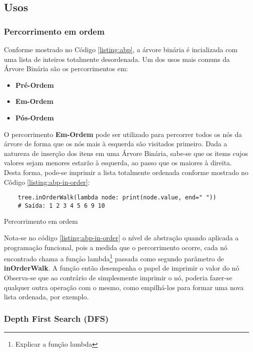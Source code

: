 \subsection{Usos}
\subsubsection{Percorrimento em ordem}
Conforme mostrado no Código \ref{listing:abp}, a árvore binária é incializada com uma lista de inteiros totalmente desordenada.
Um dos usos mais comuns da Árvore Binária são os percorrimentos em:
\begin{itemize}
    \item\textbf{Pré-Ordem}
    \item\textbf{Em-Ordem}
    \item\textbf{Pós-Ordem}
\end{itemize}

O percorrimento \textbf{Em-Ordem} pode ser utilizado para percorrer todos os nós da árvore de forma que os nós mais à esquerda são visitados primeiro. Dada a natureza de inserção dos itens em uma Árvore Binária,
sabe-se que os items cujos valores sejam menores estarão à esquerda, ao passo que os maiores à direita. Desta forma, pode-se imprimir a lista totalmente ordenada conforme mostrado no Côdigo \ref{listing:abp-in-order}:

\begin{listing}[H]
    \begin{verbatim}
    tree.inOrderWalk(lambda node: print(node.value, end=" "))
    # Saída: 1 2 3 4 5 6 9 10 
    \end{verbatim}
    \caption{Percorrimento em ordem}
    \label{listing:abp-in-order}
\end{listing}

Nota-se no código \ref{listing:abp-in-order} o nível de abstração quando aplicada a programação funcional, pois a medida que o percorrimento ocorre, cada nó encontrado chama a funçåo lambda\footnote{
    Explicar a função lambda
} passada como segundo parâmetro de \textbf{inOrderWalk}. A função então desempenha o papel de imprimir o valor do nó
Observa-se que ao contrário de simplesmente imprimir o nó, poderia fazer-se qualquer outra operação com o mesmo, como empilhá-los para formar uma nova lista
ordenada, por exemplo.

\subsubsection{Depth First Search (DFS)}

